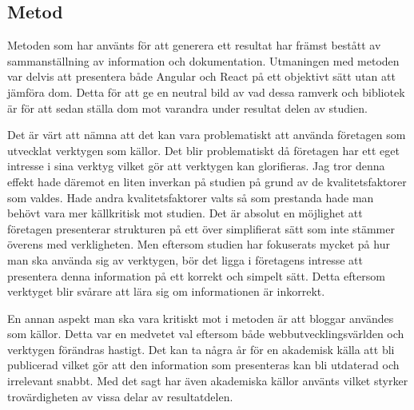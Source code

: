 \subsection{Metod}
\label{subsec:axel-discussion-method}
Metoden som har använts för att generera ett resultat har främst bestått av sammanställning av information och dokumentation. Utmaningen med metoden var delvis att presentera både Angular och React på ett objektivt sätt utan att jämföra  dom. Detta för att ge en neutral bild av vad dessa ramverk och bibliotek är för att sedan ställa dom mot varandra under resultat delen av studien. 

Det är värt att nämna att det kan vara problematiskt att använda företagen som utvecklat verktygen som källor. Det blir problematiskt då företagen har ett eget intresse i sina verktyg vilket gör att verktygen kan glorifieras. Jag tror denna effekt hade däremot en liten inverkan på studien på grund av de kvalitetsfaktorer som valdes. Hade andra kvalitetsfaktorer valts så som prestanda hade man behövt vara mer källkritisk mot studien. Det är absolut en möjlighet att företagen presenterar strukturen på ett över simplifierat sätt som inte stämmer överens med verkligheten. Men eftersom studien har fokuserats mycket på hur man ska använda sig av verktygen, bör det ligga i företagens intresse att presentera denna information på ett korrekt och simpelt sätt. Detta eftersom verktyget blir svårare att lära sig om informationen är inkorrekt.

En annan aspekt man ska vara kritiskt mot i metoden är att bloggar användes som källor. Detta var en medvetet val eftersom både webbutvecklingsvärlden och verktygen förändras hastigt. Det kan ta några år för en akademisk källa att bli publicerad vilket gör att den information som presenteras kan bli utdaterad och irrelevant snabbt. Med det sagt har även akademiska källor använts vilket styrker trovärdigheten av vissa delar av resultatdelen.

\pagebreak